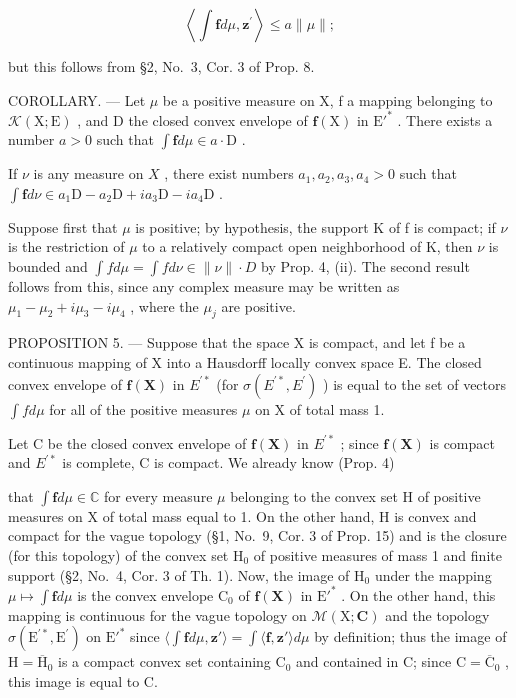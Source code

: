 \[
\left\langle \int \mathbf {f} d \mu , \mathbf {z} ^ {\prime} \right\rangle \leqslant a \| \mu \|;
\]

but this follows from §2, No.~3, Cor. 3 of Prop. 8.

COROLLARY. --- Let \(\mu\) be a positive measure on X, f a mapping belonging to \(\mathcal{K}(\mathrm{X};\mathrm{E})\) , and D the closed convex envelope of \(\mathbf{f}(\mathrm{X})\) in \(\mathrm{E}'^*\) . There exists a number \(a > 0\) such that \(\int \mathbf{f} d\mu \in a \cdot \mathrm{D}\) .

If \(\nu\) is any measure on \(X\) , there exist numbers \(a_1, a_2, a_3, a_4 > 0\) such that \(\int \mathbf{f} d\nu \in a_1\mathrm{D} - a_2\mathrm{D} + ia_3\mathrm{D} - ia_4\mathrm{D}\) .

Suppose first that \(\mu\) is positive; by hypothesis, the support K of f is compact; if \(\nu\) is the restriction of \(\mu\) to a relatively compact open neighborhood of K, then \(\nu\) is bounded and \(\int f d\mu = \int f d\nu \in \|\nu\| \cdot D\) by Prop. 4, (ii). The second result follows from this, since any complex measure may be written as \(\mu_{1} - \mu_{2} + i\mu_{3} - i\mu_{4}\) , where the \(\mu_{j}\) are positive.

PROPOSITION 5. --- Suppose that the space X is compact, and let f be a continuous mapping of X into a Hausdorff locally convex space E. The closed convex envelope of \(\mathbf{f}(\mathbf{X})\) in \(E^{\prime*}\) (for \(\sigma(E^{\prime*}, E^{\prime})\) ) is equal to the set of vectors \(\int f d\mu\) for all of the positive measures \(\mu\) on X of total mass 1.

Let C be the closed convex envelope of \(\mathbf{f}(\mathbf{X})\) in \(E^{\prime*}\) ; since \(\mathbf{f}(\mathbf{X})\) is compact and \(E^{\prime*}\) is complete, C is compact. We already know (Prop. 4)

that \(\int \mathbf{f}d\mu \in \mathbb{C}\) for every measure \(\mu\) belonging to the convex set H of positive measures on X of total mass equal to 1. On the other hand, H is convex and compact for the vague topology (§1, No.~9, Cor. 3 of Prop. 15) and is the closure (for this topology) of the convex set \(\mathrm{H}_0\) of positive measures of mass 1 and finite support (§2, No.~4, Cor. 3 of Th. 1). Now, the image of \(\mathrm{H}_0\) under the mapping \(\mu \mapsto \int \mathbf{f}d\mu\) is the convex envelope \(\mathrm{C}_0\) of \(\mathbf{f}(\mathbf{X})\) in \(\mathrm{E}'^*\) . On the other hand, this mapping is continuous for the vague topology on \(\mathcal{M}(\mathrm{X};\mathbf{C})\) and the topology \(\sigma (\mathrm{E}^{\prime *},\mathrm{E}^{\prime})\) on \(\mathrm{E}'^*\) since \(\langle \int \mathbf{f}d\mu ,\mathbf{z}'\rangle = \int \langle \mathbf{f},\mathbf{z}'\rangle d\mu\) by definition; thus the image of \(\mathrm{H} = \overline{\mathrm{H}}_0\) is a compact convex set containing \(\mathrm{C}_0\) and contained in C; since \(\mathrm{C} = \overline{\mathrm{C}}_0\) , this image is equal to C.

